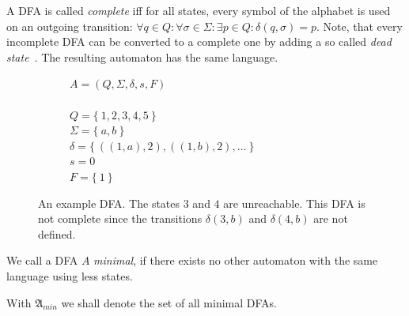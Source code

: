 A DFA is called \emph{complete} iff for all states, every symbol of the alphabet is used on an outgoing transition: $\forall q\in Q\colon \forall\sigma\in\Sigma\colon \exists p\in Q\colon \delta(q,\sigma) = p$. Note, that every incomplete DFA can be converted to a complete one by adding a so called \emph{dead state}~\cite[p. 67]{HMU01}. The resulting automaton has the same language.

\begin{figure}[H]
	\begin{subfigure}{.5\textwidth}
	\centering
	\end{subfigure}
	\hfill
	\begin{subfigure}{.4\textwidth}
		$A = (Q, \Sigma, \delta, s ,F)$ \\\\
		$Q = \{\ 1,2,3,4,5\ \}$ \\
		$\Sigma = \{\ a,b\ \}$ \\
		$\delta = \{\ ((1,a),2), ((1,b),2), \ldots\ \}$ \\
		$s = 0$ \\
		$F = \{\ 1\ \}$
	\end{subfigure}
	\caption{An example DFA. The states $3$ and $4$ are unreachable. This DFA is not complete since the transitions $\delta(3,b)$ and $\delta(4,b)$ are not defined.}
	\label{fig:dfa}
\end{figure}

\begin{definition}
	We call a DFA $A$ \emph{minimal}, if there exists no other automaton with the same language using less states.
\end{definition}
\noindent With $\mathfrak{A}_{min}$ we shall denote the set of all minimal DFAs.

